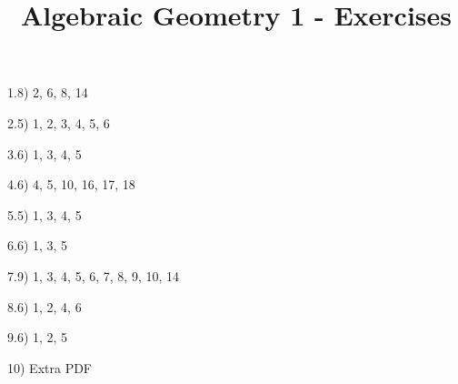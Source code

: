 \documentclass{article}
\begin{document}
\title{Algebraic Geometry 1 - Exercises}

\maketitle

1.8) 2, 6, 8, 14

2.5) 1, 2, 3, 4, 5, 6

3.6) 1, 3, 4, 5

4.6) 4, 5, 10, 16, 17, 18

5.5) 1, 3, 4, 5

6.6) 1, 3, 5

7.9) 1, 3, 4, 5, 6, 7, 8, 9, 10, 14

8.6) 1, 2, 4, 6

9.6) 1, 2, 5

10) Extra PDF
\end{document}
